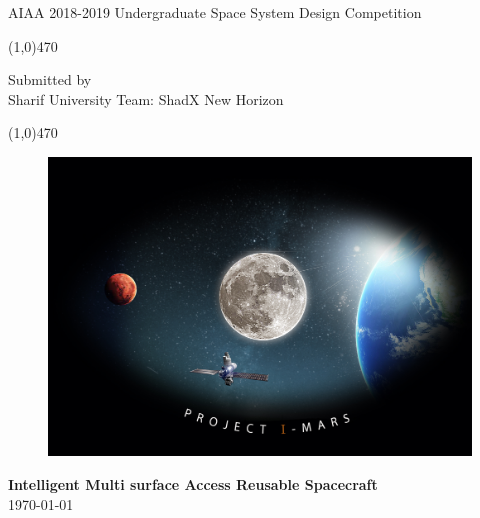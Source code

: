 \documentclass[openright,10pt,onecolumn]{report}
\begin{document}
\LARGE

\thispagestyle{empty}
\begin{centering}

  {\color{white}AIAA 2018-2019 Undergraduate Space System Design Competition}
  \begin{center}
    {\color{white}\line(1,0){470}} 
   \end{center}
   
  {\color{white}Submitted by}\\
 
  {\color{white}Sharif University Team: ShadX New Horizon}
  \begin{center}
    {\color{white}\line(1,0){470}} 
   \end{center}
     
  \begin{figure}[hbtp]   
    \centering
    {\includegraphics[width=\linewidth]{First_page}}
  \end{figure}
  \pagecolor{black}\afterpage{\nopagecolor}
  
  
  {\color{white}\textbf{Intelligent Multi surface Access Reusable Spacecraft}}\\
  
  {\color{white}\today}  

\end{centering}



\normalsize
\newpage%

\newpage
\singlespacing

\renewcommand{\contentsname}{Table of Contents}
\end{document}
